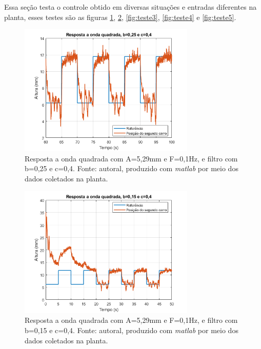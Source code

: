 \documentclass{ifacconf}
\begin{document}
Essa seção testa o controle obtido em diversas situações e entradas diferentes na planta, esses testes são as figuras \ref{fig:teste1}, \ref{fig:teste2}, \ref{fig:teste3}, 
\ref{fig:teste4} e \ref{fig:teste5}.


\begin{figure}[!htb]
  \begin{center}
  \includegraphics[width=8.4cm]{figures/resultado_teste1.png}    %
  \caption{Resposta a onda quadrada com A=5,29mm e F=0,1Hz, e filtro com b=0,25 e c=0,4. Fonte: autoral, produzido com \textit{matlab} por meio dos dados coletados na planta.} 
  \label{fig:teste1}
  \end{center}
\end{figure}

\begin{figure}[!htb]
  \begin{center}
  \includegraphics[width=8.4cm]{figures/resultado_teste2.png}    %
  \caption{Resposta a onda quadrada com A=5,29mm e F=0,1Hz, e filtro com b=0,15 e c=0,4. Fonte: autoral, produzido com \textit{matlab} por meio dos dados coletados na planta.} 
  \label{fig:teste2}
  \end{center}
\end{figure}
\end{document}
